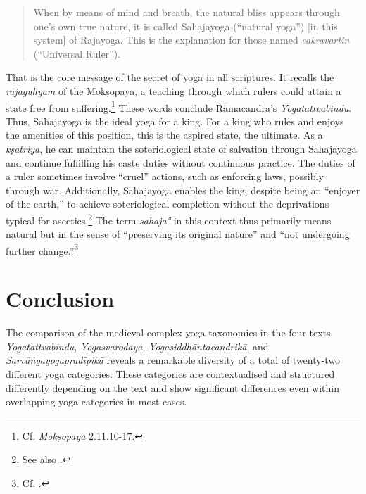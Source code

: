 \begin{quote}
 When by means of mind and breath, the natural bliss appears through one's own true nature, it is called Sahajayoga (``natural yoga'') [in this system] of Rajayoga. This is the explanation for those named \textit{cakravartin} (``Universal Ruler'').
\end{quote}

That is the core message of the secret of yoga in all scriptures. It recalls the \textit{rājaguhyam} of the Mokṣopaya, a teaching through which rulers could attain a state free from suffering.\footnote{Cf. \emph{Mokṣopaya} 2.11.10-17.\nocite{moskopaya12}} These words conclude Rāmacandra's \emph{Yogatattvabindu}. Thus, Sahajayoga is the ideal yoga for a king. For a king who rules and enjoys the amenities of this position, this is the aspired state, the ultimate. As a \textit{kṣatriya}, he can maintain the soteriological state of salvation through Sahajayoga and continue fulfilling his caste duties without continuous practice. The duties of a ruler sometimes involve ``cruel'' actions, such as enforcing laws, possibly through war. Additionally, Sahajayoga enables the king, despite being an ``enjoyer of the earth,'' to achieve soteriological completion without the deprivations typical for ascetics.\footnote{See also \citeauthor[2006: 121]{hanneder2006}.} The term \textit{sahaja°} in this context thus primarily means natural but in the sense of ``preserving its original nature'' and ``not undergoing further change.''\footnote{Cf. .} 

\section{Conclusion}
\label{comparisonconclusion}
The comparison of the medieval complex yoga taxonomies in the four texts \textit{Yogatattvabindu}, \textit{Yogasvarodaya}, \textit{Yogasiddhāntacandrikā}, and \textit{Sarvāṅgayogapradīpikā} reveals a remarkable diversity of a total of twenty-two different yoga categories. These categories are contextualised and structured differently depending on the text and show significant differences even within overlapping yoga categories in most cases.

